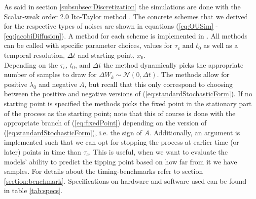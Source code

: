 As said in section \ref{subsubsec:Discretization} the simulations are done with the Scalar-weak order 2.0 Ito-Taylor method \cite[algorithm 8.5]{Srkk2019}. The concrete schemes that we derived for the respective types of noises are shown in equations (\ref{eq:OUSim} - \ref{eq:jacobiDiffusion}). A method for each scheme is implemented in . All methods can be called with specific parameter choices, values for $\tau_c$ and $t_0$ as well as a temporal resolution, $\Delta t$ and starting point, $x_0$. \\Depending on the $\tau_c$, $t_0$, and $\Delta t$ the method dynamically picks the appropriate number of samples to draw for $\Delta W_k\sim\mathcal{N}\left(0,\Delta t\right)$. The methods allow for positive $\lambda_0$ and negative $A$, but recall that this only correspond to choosing between the positive and negative versions of (\ref{eq:standardStochasticForm}). If no starting point is specified the methods picks the fixed point in the stationary part of the process as the starting point; note that this of course is done with the appropriate branch of (\ref{eq:fixedPoint}) depending on the version of (\ref{eq:standardStochasticForm}), i.e. the sign of $A$. Additionally, an argument is implemented such that we can opt for stopping the process at earlier time (or later) points in time than $\tau_c$. This is useful, when we want to evaluate the models' ability to predict the tipping point based on how far from it we have samples. For details about the timing-benchmarks refer to section \ref{section:benchmark}. Specifications on hardware and software used can be found in table \ref{tab:specs}. 
